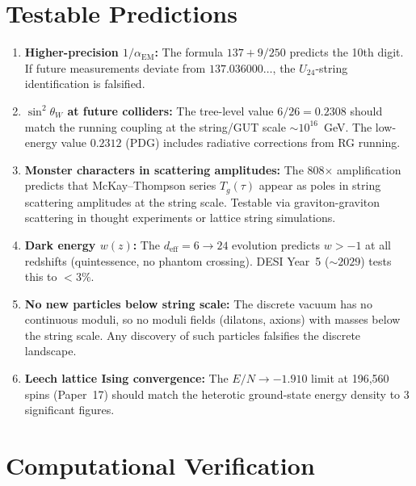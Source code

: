 \documentclass[12pt,a4paper]{article}
\theoremstyle{definition}\newtheorem{definition}[theorem]{Definition}
\theoremstyle{remark}\newtheorem{remark}[theorem]{Remark}
\begin{document}
\section{Testable Predictions}
\label{sec:predictions}

\begin{enumerate}
  \item \textbf{Higher-precision $1/\alpha_{\mathrm{EM}}$:} The formula
  $137 + 9/250$ predicts the 10th digit. If future measurements deviate
  from $137.036000\ldots$, the $U_{24}$-string identification is falsified.

  \item \textbf{$\sin^2\theta_W$ at future colliders:} The tree-level value
  $6/26 = 0.2308$ should match the running coupling at the string/GUT scale
  $\sim 10^{16}$~GeV. The low-energy value $0.2312$ (PDG) includes radiative
  corrections from RG running.

  \item \textbf{Monster characters in scattering amplitudes:} The 808$\times$
  amplification predicts that McKay--Thompson series $T_g(\tau)$ appear as
  poles in string scattering amplitudes at the string scale. Testable via
  graviton-graviton scattering in thought experiments or lattice string
  simulations.

  \item \textbf{Dark energy $w(z)$:} The $d_{\mathrm{eff}} = 6 \to 24$ evolution
  predicts $w > -1$ at all redshifts (quintessence, no phantom crossing).
  DESI Year~5 ($\sim 2029$) tests this to $< 3\%$.

  \item \textbf{No new particles below string scale:} The discrete vacuum has no
  continuous moduli, so no moduli fields (dilatons, axions) with masses below the
  string scale. Any discovery of such particles falsifies the discrete landscape.

  \item \textbf{Leech lattice Ising convergence:} The $E/N \to -1.910$ limit at
  196{,}560 spins (Paper~17) should match the heterotic ground-state energy
  density to 3 significant figures.
\end{enumerate}

\section{Computational Verification}
\label{sec:verification}
\end{document}
